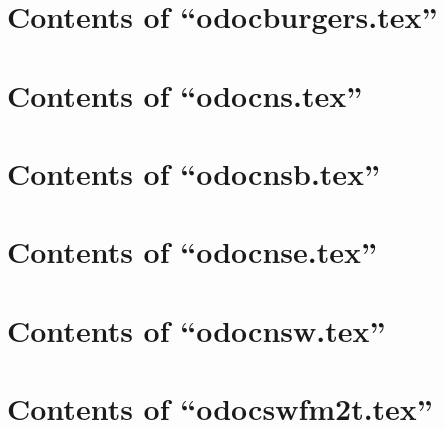 \begin{itemize}

\end{itemize}

\section{Contents of ``odocburgers.tex''}

\begin{itemize}

\end{itemize}

\section{Contents of ``odocns.tex''}

\begin{itemize}

\end{itemize}

\section{Contents of ``odocnsb.tex''}

\begin{itemize}

\end{itemize}

\section{Contents of ``odocnse.tex''}

\begin{itemize}

\end{itemize}

\section{Contents of ``odocnsw.tex''}

\begin{itemize}

\end{itemize}

\section{Contents of ``odocswfm2t.tex''}

\begin{itemize}

\end{itemize}
